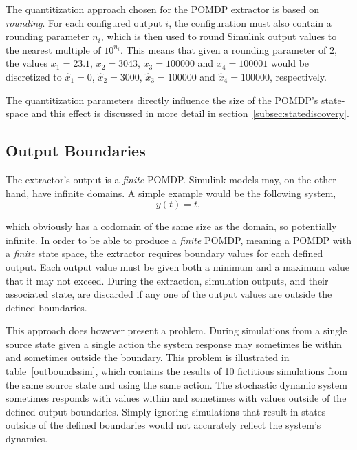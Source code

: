 The quantitization approach chosen for the POMDP extractor is based on \textit{rounding}. For each configured output $i$, the configuration must also contain a rounding parameter $n_i$, which is then used to round Simulink output values to the nearest multiple of $10^{n_i}$. This means that given a rounding parameter of $2$, the values $x_1=23.1$, $x_2=3043$, $x_3=100000$ and $x_4=100001$ would be discretized to $\hat{x}_1=0$, $\hat{x}_2=3000$, $\hat{x}_3=100000$ and $\hat{x}_4=100000$, respectively.

The quantitization parameters directly influence the size of the POMDP's state-space and this effect is discussed in more detail in section~\ref{subsec:statediscovery}.

\subsection{Output Boundaries}
\label{subsec:outputboundaries}

The extractor's output is a \textit{finite} POMDP. Simulink models may, on the other hand, have infinite domains. A simple example would be the following system,
\[
y(t) = t,
\]

which obviously has a codomain of the same size as the domain, so potentially infinite. In order to be able to produce a \textit{finite} POMDP, meaning a POMDP with a \textit{finite} state space, the extractor requires boundary values for each defined output. Each output value must be given both a minimum and a maximum value that it may not exceed. During the extraction, simulation outputs, and their associated state, are discarded if any one of the output values are outside the defined boundaries.

This approach does however present a problem. During simulations from a single source state given a single action the system response may sometimes lie within and sometimes outside the boundary. This problem is illustrated in table~\ref{outboundssim}, which contains the results of 10 fictitious simulations from the same source state and using the same action. The stochastic dynamic system sometimes responds with values within and sometimes with values outside of the defined output boundaries. Simply ignoring simulations that result in states outside of the defined boundaries would not accurately reflect the system's dynamics.

